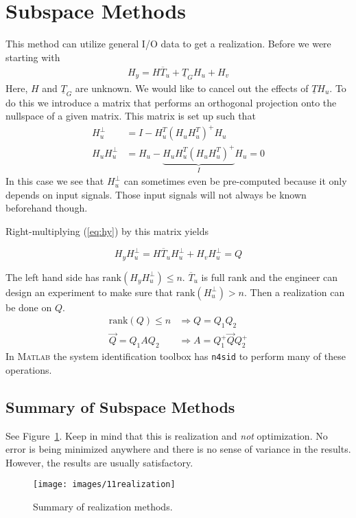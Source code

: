 \section{Subspace Methods}
This method can utilize general I/O data to get a realization.
Before we were starting with
\begin{align}
\label{eq:hy}
H_y=H\overline{T}_u+\underline{T}_G H_u+H_v
\end{align}
Here, $H$ and $\underline{T}_G$ are unknown.
We would like to cancel out the effects of $\underline{T}H_u$.
To do this we introduce a matrix that performs an orthogonal projection onto the nullspace of a given matrix.
This matrix is set up such that
\begin{align*}
H_u^\perp &= I-H_u^T{(H_u H_u^T)}^+H_u \\
H_u H_u^\perp &= H_u - \underbrace{H_u H_u^T{(H_u H_u^T)}^+}_{I}H_u = 0
\end{align*}
In this case we see that $H_u^\perp$ can sometimes even be pre-computed because it only depends on input signals.
Those input signals will not always be known beforehand though.

Right-multiplying (\ref{eq:hy}) by this matrix yields

\begin{equation*}
H_y H_u^\perp = H\overline{T}_u H_u^\perp + H_v H_u^\perp = Q
\end{equation*}

The left hand side has $\text{rank}(H_y H_u^\perp)\leq n$.
$\overline{T}_u$ is full rank and the engineer can design an experiment to make sure that $\text{rank}(H_u^\perp)>n$.
Then a realization can be done on $Q$.
\begin{align*}
\text{rank}(Q) \leq n &\Rightarrow Q=Q_1Q_2 \\
\vec{Q} = Q_1AQ_2 &\Rightarrow A=Q_1^+\vec{Q}Q_2^+
\end{align*}
In \textsc{Matlab} the system identification toolbox has \texttt{n4sid} to perform many of these operations.

\subsection{Summary of Subspace Methods}
See Figure~\ref{fig:11realization}.
Keep in mind that this is realization and \textit{not} optimization.
No error is being minimized anywhere and there is no sense of variance in the results.
However, the results are usually satisfactory.

\begin{figure}[ht!]
\centering
\texttt{[image: images/11realization]}
\caption{Summary of realization methods.}%
\label{fig:11realization}
\end{figure}

